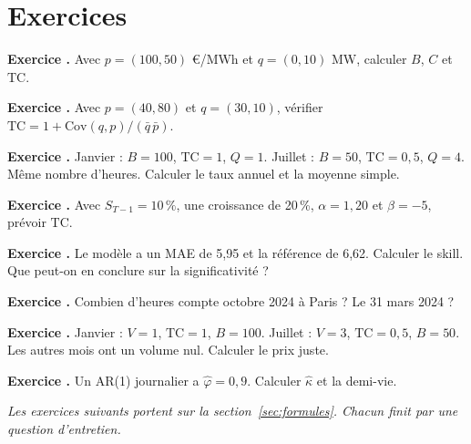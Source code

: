 \documentclass[11pt,a4paper]{article}
\newcommand{\TC}{\mathrm{TC}}
\newcommand{\Cov}{\mathrm{Cov}}
\newcounter{exo}
\newcommand{\lescorriges}{}
\newcommand{\corrigeexo}[2]{\par\medskip\noindent\textbf{Exercice #1.} #2\par}
\newcommand{\exo}[2]{\stepcounter{exo}\par\medskip\noindent\textbf{Exercice \theexo.} #1\par
  \xdef\lescorriges{\unexpanded\expandafter{\lescorriges}\noexpand\corrigeexo{\theexo}{\unexpanded{#2}}}}
\begin{document}
\section{Exercices}

\exo{Avec $p = (100, 50)$ €/MWh et $q = (0, 10)$ MW, calculer $B$, $C$ et $\TC$.}{$B = 75$, $C = 50$, $\TC = 2/3$.}

\exo{Avec $p = (40, 80)$ et $q = (30, 10)$, vérifier $\TC = 1 + \Cov(q,p)/(\bar q\,\bar p)$.}{$C = 2000/40 = 50$ et $B = 60$, donc $\TC = 5/6$. $\Cov = 1000 - 20 \times 60 = -200$, d'où $1 - 200/1200 = 5/6$.}

\exo{Janvier : $B = 100$, $\TC = 1$, $Q = 1$. Juillet : $B = 50$, $\TC = 0{,}5$, $Q = 4$. Même nombre d'heures. Calculer le taux annuel et la moyenne simple.}{$B_{\text{an}} = 75$ et $C_{\text{an}} = (1 \times 100 + 4 \times 25)/5 = 40$, donc $\TC_{\text{an}} = 0{,}533$. La moyenne simple vaut $0{,}75$.}

\exo{Avec $S_{T-1} = 10\,\%$, une croissance de 20\,\%, $\alpha = 1{,}20$ et $\beta = -5$, prévoir $\TC$.}{$\hat S = 12\,\%$ et $\widehat{\TC} = 1{,}20 - 5 \times 0{,}12 = 0{,}60$.}

\exo{Le modèle a un MAE de 5,95 et la référence de 6,62. Calculer le skill. Que peut-on en conclure sur la significativité ?}{$1 - 5{,}95/6{,}62 = 0{,}10$. Rien : il faut un test comme Diebold-Mariano.}

\exo{Combien d'heures compte octobre 2024 à Paris ? Le 31 mars 2024 ?}{745 heures (une heure de plus au passage à l'heure d'hiver) et 23 heures.}

\exo{Janvier : $V = 1$, $\TC = 1$, $B = 100$. Juillet : $V = 3$, $\TC = 0{,}5$, $B = 50$. Les autres mois ont un volume nul. Calculer le prix juste.}{$(1 \times 1 \times 100 + 3 \times 0{,}5 \times 50)/4 = 43{,}75$~€/MWh.}

\exo{Un AR(1) journalier a $\hat\varphi = 0{,}9$. Calculer $\hat\kappa$ et la demi-vie.}{$\hat\kappa = -\ln 0{,}9 = 0{,}105$ par jour et la demi-vie vaut $\ln 2 / 0{,}105 \approx 6{,}6$ jours.}

\medskip
\noindent\textit{Les exercices suivants portent sur la section~\ref{sec:formules}. Chacun finit par une question d'entretien.}
\end{document}
